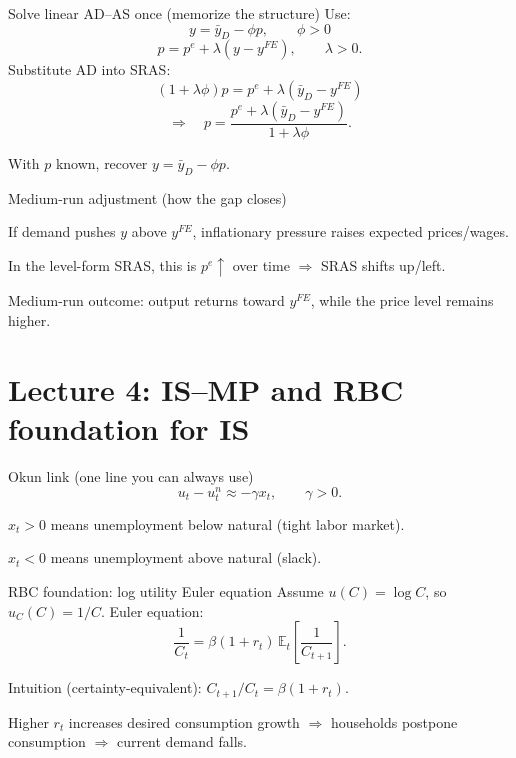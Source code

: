 \documentclass[aspectratio=169,xcolor=dvipsnames]{beamer}
\let\tempone\itemize
\let\temptwo\enditemize
\renewenvironment{itemize}{\tempone\addtolength{\itemsep}{\fill}}{\temptwo}
\begin{document}
\begin{frame}{Solve linear AD--AS once (memorize the structure)}
Use:
\[
y=\bar y_D-\phi p,\qquad \phi>0
\]
\[
p=p^e+\lambda(y-y^{FE}),\qquad \lambda>0.
\]
Substitute AD into SRAS:
\[
(1+\lambda\phi)p=p^e+\lambda(\bar y_D-y^{FE})
\]
\[
\Rightarrow\quad p=\frac{p^e+\lambda(\bar y_D-y^{FE})}{1+\lambda\phi}.
\]

\begin{itemize}
\item With $p$ known, recover $y=\bar y_D-\phi p$.
\end{itemize}
\end{frame}

\begin{frame}{Medium-run adjustment (how the gap closes)}
\begin{itemize}
\item If demand pushes $y$ above $y^{FE}$, inflationary pressure raises expected prices/wages.
\item In the level-form SRAS, this is $p^e\uparrow$ over time $\Rightarrow$ SRAS shifts up/left.
\item Medium-run outcome: output returns toward $y^{FE}$, while the price level remains higher.
\end{itemize}
\end{frame}

\section[Lecture 4]{Lecture 4: IS--MP and RBC foundation for IS}

\begin{frame}{Okun link (one line you can always use)}
\[
u_t-u_t^n\approx -\gamma x_t,\qquad \gamma>0.
\]
\begin{itemize}
\item $x_t>0$ means unemployment below natural (tight labor market).
\item $x_t<0$ means unemployment above natural (slack).
\end{itemize}
\end{frame}

\begin{frame}{RBC foundation: log utility Euler equation}
Assume $u(C)=\log C$, so $u_C(C)=1/C$. Euler equation:
\[
\frac{1}{C_t}=\beta(1+r_t)\,\mathbb{E}_t\left[\frac{1}{C_{t+1}}\right].
\]
\begin{itemize}
\item Intuition (certainty-equivalent): $C_{t+1}/C_t=\beta(1+r_t)$.
\item Higher $r_t$ increases desired consumption growth $\Rightarrow$ households postpone consumption $\Rightarrow$ current demand falls.
\end{itemize}
\end{frame}
\end{document}
